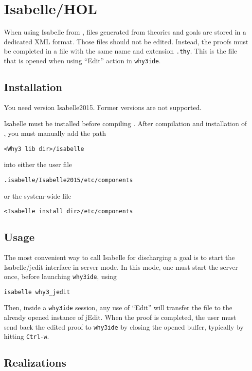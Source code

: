 \section{Isabelle/HOL}
\label{sec:isabelle}


When using Isabelle from \why, files generated from \why theories and
goals are stored in a dedicated XML format. Those files should not be
edited. Instead, the proofs must be completed in a file with the same
name and extension \texttt{.thy}. This is the file that is opened when
using ``Edit'' action in \texttt{why3ide}.

\subsection{Installation}

You need version Isabelle2015. Former versions are not supported.

Isabelle must be installed before compiling \why. After compilation
and installation of \why, you must manually add the path
\begin{verbatim}
<Why3 lib dir>/isabelle
\end{verbatim}
into either the user file
\begin{verbatim}
.isabelle/Isabelle2015/etc/components
\end{verbatim}
or the system-wide file
\begin{verbatim}
<Isabelle install dir>/etc/components
\end{verbatim}

\subsection{Usage}

The most convenient way to call Isabelle for discharging a \why goal
is to start the Isabelle/jedit interface in server mode. In this mode,
one must start the server once, before launching \texttt{why3ide},
using
\begin{verbatim}
isabelle why3_jedit
\end{verbatim}
Then, inside a \texttt{why3ide} session, any use of ``Edit'' will
transfer the file to the already opened instance of jEdit. When the
proof is completed, the user must send back the edited proof to
\texttt{why3ide} by closing the opened buffer, typically by hitting
\texttt{Ctrl-w}.

\subsection{Realizations}

